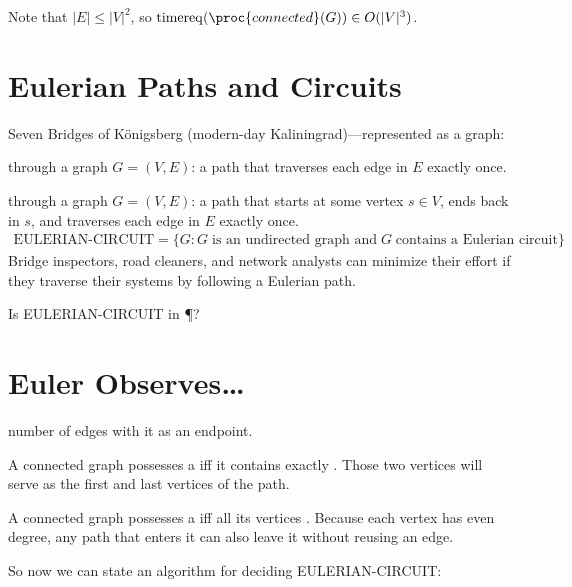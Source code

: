 \documentclass[a4paper]{report}
\newcommand{\bookref}[3]{\marginpar{\faBook{}~#1\\Chapter #2\\Section #3}}
\theoremstyle{definition}
\DeclareMathOperator*{\treq}{timereq}
\begin{document}
Note that $|E| \leq  |V|^2$, so $\treq(\proc{connected}(G)) \in O(|V|^3)$.

\section{Eulerian Paths and Circuits}
\bookref{ER}{28}{28.1.5}
Seven Bridges of K\"onigsberg (modern-day Kaliningrad)---represented as a graph:

\begin{center}
% 

\end{center}

 through a graph $G = (V,E)$: a path that traverses each edge in $E$ exactly once.

 through a graph $G = (V,E)$: a path that starts at some vertex $s \in V$, ends back in $s$, and traverses each edge in $E$ exactly once.
%
\begin{align*}
\text{EULERIAN-CIRCUIT} = \{G : G \;\text{is an undirected graph and} \; G \; \text{contains a Eulerian circuit}\}
\end{align*}
%
 Bridge inspectors, road cleaners, and network analysts can minimize their effort if they traverse their systems by following a Eulerian path.

Is EULERIAN-CIRCUIT in \P?

\section{Euler Observes\dots{}}
\bookref{ER}{28}{28.1.5}
 number of edges with it as an endpoint.

A connected graph possesses a  iff it contains exactly . Those two vertices will serve as the first and last vertices of the path.

A connected graph possesses a  iff all its vertices . Because each vertex has even degree, any path that enters it can also leave it without reusing an edge.

So now we can state an algorithm for deciding EULERIAN-CIRCUIT:
\end{document}
